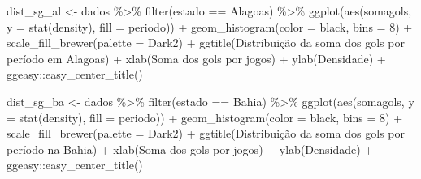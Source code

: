 \documentclass[
]{article}
\newenvironment{Shaded}{\begin{snugshade}}{\end{snugshade}}
\newcommand{\AttributeTok}[1]{\textcolor[rgb]{0.77,0.63,0.00}{#1}}
\newcommand{\DecValTok}[1]{\textcolor[rgb]{0.00,0.00,0.81}{#1}}
\newcommand{\FunctionTok}[1]{\textcolor[rgb]{0.00,0.00,0.00}{#1}}
\newcommand{\NormalTok}[1]{#1}
\newcommand{\OtherTok}[1]{\textcolor[rgb]{0.56,0.35,0.01}{#1}}
\newcommand{\SpecialCharTok}[1]{\textcolor[rgb]{0.00,0.00,0.00}{#1}}
\newcommand{\StringTok}[1]{\textcolor[rgb]{0.31,0.60,0.02}{#1}}
\begin{document}
\begin{Shaded}
\begin{Highlighting}[]
\NormalTok{dist\_sg\_al }\OtherTok{\textless{}{-}}\NormalTok{ dados }\SpecialCharTok{\%\textgreater{}\%} \FunctionTok{filter}\NormalTok{(estado }\SpecialCharTok{==} \StringTok{\textquotesingle{}Alagoas\textquotesingle{}}\NormalTok{) }\SpecialCharTok{\%\textgreater{}\%}
  \FunctionTok{ggplot}\NormalTok{(}\FunctionTok{aes}\NormalTok{(somagols, }\AttributeTok{y =} \FunctionTok{stat}\NormalTok{(density), }\AttributeTok{fill =}\NormalTok{ periodo)) }\SpecialCharTok{+} 
  \FunctionTok{geom\_histogram}\NormalTok{(}\AttributeTok{color =} \StringTok{\textquotesingle{}black\textquotesingle{}}\NormalTok{, }\AttributeTok{bins =} \DecValTok{8}\NormalTok{) }\SpecialCharTok{+} 
  \FunctionTok{scale\_fill\_brewer}\NormalTok{(}\AttributeTok{palette =} \StringTok{\textquotesingle{}Dark2\textquotesingle{}}\NormalTok{) }\SpecialCharTok{+}
  \FunctionTok{ggtitle}\NormalTok{(}\StringTok{\textquotesingle{}Distribuição da soma dos gols por período em Alagoas\textquotesingle{}}\NormalTok{) }\SpecialCharTok{+}
  \FunctionTok{xlab}\NormalTok{(}\StringTok{\textquotesingle{}Soma dos gols por jogos\textquotesingle{}}\NormalTok{) }\SpecialCharTok{+} \FunctionTok{ylab}\NormalTok{(}\StringTok{\textquotesingle{}Densidade\textquotesingle{}}\NormalTok{) }\SpecialCharTok{+}
\NormalTok{  ggeasy}\SpecialCharTok{::}\FunctionTok{easy\_center\_title}\NormalTok{()}

\NormalTok{dist\_sg\_ba }\OtherTok{\textless{}{-}}\NormalTok{ dados }\SpecialCharTok{\%\textgreater{}\%} \FunctionTok{filter}\NormalTok{(estado }\SpecialCharTok{==} \StringTok{\textquotesingle{}Bahia\textquotesingle{}}\NormalTok{) }\SpecialCharTok{\%\textgreater{}\%}
  \FunctionTok{ggplot}\NormalTok{(}\FunctionTok{aes}\NormalTok{(somagols, }\AttributeTok{y =} \FunctionTok{stat}\NormalTok{(density), }\AttributeTok{fill =}\NormalTok{ periodo)) }\SpecialCharTok{+} 
  \FunctionTok{geom\_histogram}\NormalTok{(}\AttributeTok{color =} \StringTok{\textquotesingle{}black\textquotesingle{}}\NormalTok{, }\AttributeTok{bins =} \DecValTok{8}\NormalTok{) }\SpecialCharTok{+}
  \FunctionTok{scale\_fill\_brewer}\NormalTok{(}\AttributeTok{palette =} \StringTok{\textquotesingle{}Dark2\textquotesingle{}}\NormalTok{) }\SpecialCharTok{+}
  \FunctionTok{ggtitle}\NormalTok{(}\StringTok{\textquotesingle{}Distribuição da soma dos gols por período na Bahia\textquotesingle{}}\NormalTok{) }\SpecialCharTok{+}
  \FunctionTok{xlab}\NormalTok{(}\StringTok{\textquotesingle{}Soma dos gols por jogos\textquotesingle{}}\NormalTok{) }\SpecialCharTok{+} \FunctionTok{ylab}\NormalTok{(}\StringTok{\textquotesingle{}Densidade\textquotesingle{}}\NormalTok{) }\SpecialCharTok{+}
\NormalTok{  ggeasy}\SpecialCharTok{::}\FunctionTok{easy\_center\_title}\NormalTok{()}


\end{Highlighting}
\end{Shaded}
\end{document}
